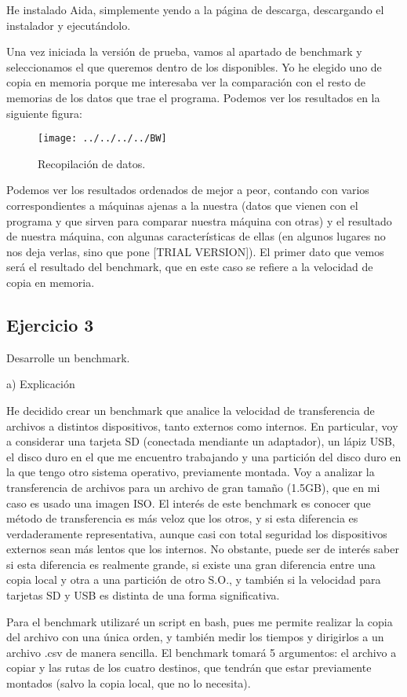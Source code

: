 \documentclass[a4paper, 11pt]{article} %
\begin{document}
He instalado Aida, simplemente yendo a la página de descarga, descargando el instalador y ejecutándolo. 
 
Una vez iniciada la versión de prueba, vamos al apartado de benchmark y seleccionamos el que queremos dentro de los disponibles. Yo he elegido uno de copia en memoria porque me interesaba ver la comparación con el resto de memorias de los datos que trae el programa. Podemos ver los resultados en la siguiente figura: 

\begin{figure}[htpb]
\centering
\texttt{[image: ../../../../BW]}
\caption{Recopilación de datos.}
\end{figure}

Podemos ver los resultados ordenados de mejor a peor, contando con varios correspondientes a máquinas ajenas a la nuestra (datos que vienen con el programa y que sirven para comparar nuestra máquina con otras) y el resultado de nuestra máquina, con algunas características de ellas (en algunos lugares no nos deja verlas, sino que pone [TRIAL VERSION]). El primer dato que vemos será el resultado del benchmark, que en este caso se refiere a la velocidad de copia en memoria. 

\subsection{Ejercicio 3}
Desarrolle un benchmark. 

a) Explicación

He decidido crear un benchmark que analice la velocidad de transferencia de archivos a distintos dispositivos, tanto externos como internos. En particular, voy a considerar una tarjeta SD (conectada mendiante un adaptador), un lápiz USB, el disco duro en el que me encuentro trabajando y una partición del disco duro en la que tengo otro sistema operativo, previamente montada. Voy a analizar la transferencia de archivos para un archivo de gran tamaño (1.5GB), que en mi caso es usado una imagen ISO. El interés de este benchmark es conocer que método de transferencia es más veloz que los otros, y si esta diferencia es verdaderamente representativa, aunque casi con total seguridad los dispositivos externos sean más lentos que los internos. No obstante, puede ser de interés saber si esta diferencia es realmente grande, si existe una gran diferencia entre una copia local y otra a una partición de otro S.O., y también si la velocidad para tarjetas SD y USB es distinta de una forma significativa. 

Para el benchmark utilizaré un script en bash, pues me permite realizar la copia del archivo con una única orden, y también medir los tiempos y dirigirlos a un archivo .csv de manera sencilla. El benchmark tomará 5 argumentos: el archivo a copiar y las rutas de los cuatro destinos, que tendrán que estar previamente montados (salvo la copia local, que no lo necesita). 
\end{document}
